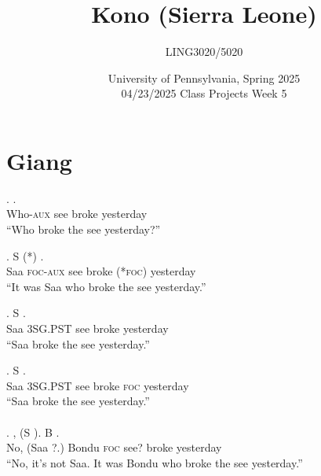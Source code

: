 \documentclass{assets/fieldnotes}
\title{Kono (Sierra Leone)}
\author{LING3020/5020}
\date{University of Pennsylvania, Spring 2025\\04/23/2025 Class Projects Week 5}
\begin{document}
\maketitle

\maketitle
\tableofcontents

\section{Giang}
\exg.    .\\
Who-\textsc{aux} see broke yesterday\\
``Who broke the see yesterday?''

\exg. S    (*) .\\
Saa \textsc{foc-aux} see broke (*\textsc{foc}) yesterday\\
``It was Saa who broke the see yesterday.''

\exg. S    .\\
Saa \textsc{3SG.PST} see broke yesterday\\
``Saa broke the see yesterday.''\\

\exg. S     .\\
Saa \textsc{3SG.PST} see broke \textsc{foc} yesterday\\
``Saa broke the see yesterday.''\\
\\

\exg. , (S ). B    .\\
No, (Saa ?.) Bondu \textsc{foc} see? broke yesterday\\
``No, it's not Saa. It was Bondu who broke the see yesterday.''
\end{document}
